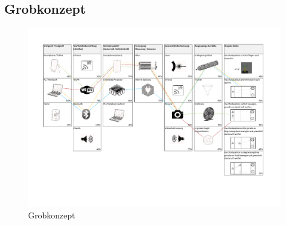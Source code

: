 ﻿\begin{landscape}
	\section{Grobkonzept}
		\begin{figure}[h!]
			\includegraphics[page=1,scale=0.75,clip,trim=17mm 37mm 21mm 19mm]{Morphologie/Bilder/Grobkonzept.pdf}
			\centering
			\caption{Grobkonzept} 
			\label{abb:Grobkonzept}
		\end{figure}	
\end{landscape} 

